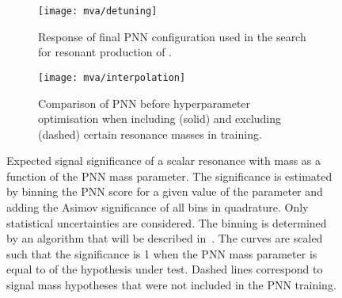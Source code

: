 \begin{figure}[htbp]
  \centering

  \begin{subfigure}[t]{.49\textwidth}
    \texttt{[image: mva/detuning]}
    \caption{Response of final PNN configuration used in the search
      for resonant production of \HH.}
  \end{subfigure}\hfill%
  \begin{subfigure}[t]{.49\textwidth}
    \centering
    \texttt{[image: mva/interpolation]}
    \caption{Comparison of PNN before hyperparameter optimisation when
      including (solid) and excluding (dashed) certain resonance
      masses in training.}
  \end{subfigure}

  \caption{Expected signal significance of a scalar resonance with
    mass \mX as a function of the PNN mass parameter. The significance
    is estimated by binning the PNN score for a given value of the
    parameter and adding the Asimov significance of all bins in
    quadrature. Only statistical uncertainties are considered. The
    binning is determined by an algorithm that will be described
    in~. The curves are scaled such that the
    significance is 1 when the PNN mass parameter is equal to \mX of
    the hypothesis under test. Dashed lines correspond to signal mass
    hypotheses that were not included in the PNN training.}
  \label{fig:pnn_properties}
\end{figure}


